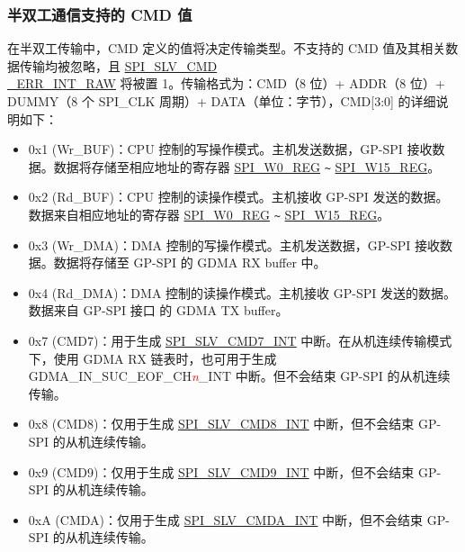 \documentclass[main\_\_CN.tex]{subfiles}
\begin{document}
\subsubsection{半双工通信支持的 CMD 值} \label{GP-SPI HD salve format}

在半双工传输中，CMD 定义的值将决定传输类型。不支持的 CMD 值及其相关数据传输均被忽略，且  \hyperref[fielddesc:SPISLVCMDERRINTRAW]{SPI\_SLV\_CMD\\\_ERR\_INT\_RAW} 将被置 1。传输格式为：CMD（8 位）+ ADDR（8 位）+ DUMMY（8 个 SPI\_CLK 周期）+ DATA（单位：字节），CMD[3:0] 的详细说明如下：

\begin{itemize}
    \item \label{cmd:wrbuf} 0x{}1 (Wr\_BUF)：CPU 控制的写操作模式。主机发送数据，GP-SPI 接收数据。数据将存储至相应地址的寄存器  \hyperref[regdesc:SPIW0REG]{SPI\_W0\_REG} \verb+~+ \hyperref[regdesc:SPIW15REG]{SPI\_W15\_REG}。

    \item \label{cmd:rdbuf} 0x{}2 (Rd\_BUF)：CPU 控制的读操作模式。主机接收 GP-SPI 发送的数据。数据来自相应地址的寄存器  \hyperref[regdesc:SPIW0REG]{SPI\_W0\_REG} \verb+~+ \hyperref[regdesc:SPIW15REG]{SPI\_W15\_REG}。

    \item \label{cmd:wrdma} 0x{}3 (Wr\_DMA)：DMA 控制的写操作模式。主机发送数据，GP-SPI 接收数据。数据将存储至 GP-SPI 的 GDMA RX buffer 中。

    \item 0x{}4 (Rd\_DMA)：DMA 控制的读操作模式。主机接收 GP-SPI 发送的数据。数据来自 GP-SPI 接口 的 GDMA TX buffer。

    \item \label{cmd:CMD7} 0x{}7 (CMD7)：用于生成  \hyperref[int:SPISLVCMD7INT]{SPI\_SLV\_CMD7\_INT} 中断。在从机连续传输模式下，使用 GDMA RX 链表时，也可用于生成 GDMA\_IN\_SUC\_EOF\_CH\textcolor{red}{\it{n}}\_INT  中断。但不会结束 GP-SPI 的从机连续传输。

    \item 0x{}8 (CMD8)：仅用于生成  \hyperref[int:SPISLVCMD8INT]{SPI\_SLV\_CMD8\_INT} 中断，但不会结束 GP-SPI 的从机连续传输。

    \item 0x{}9 (CMD9)：仅用于生成  \hyperref[int:SPISLVCMD9INT]{SPI\_SLV\_CMD9\_INT} 中断，但不会结束 GP-SPI 的从机连续传输。

    \item 0x{}A (CMDA)：仅用于生成  \hyperref[int:SPISLVCMDAINT]{SPI\_SLV\_CMDA\_INT} 中断，但不会结束 GP-SPI 的从机连续传输。

\end{itemize}
\end{document}
